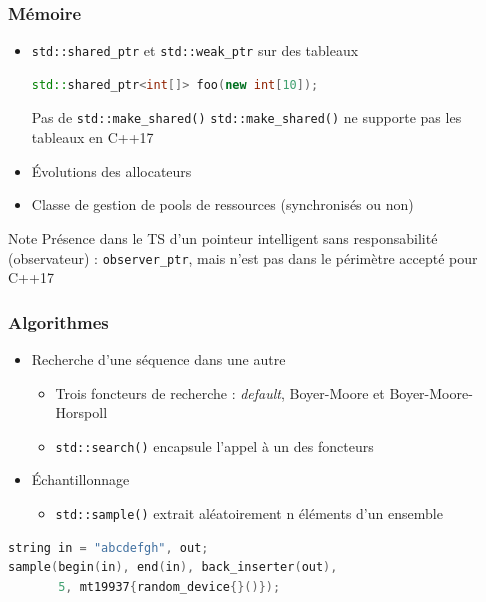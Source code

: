 \documentclass[C++.tex]{subfiles}
\begin{document}
\begin{frame}[fragile]
	\frametitle{Mémoire}
	\begin{itemize}
		\item \lstinline|std::shared_ptr| et \lstinline|std::weak_ptr| sur des tableaux

	\begin{lstlisting}[language=C++]
std::shared_ptr<int[]> foo(new int[10]);\end{lstlisting}

\begin{alertblock}{Pas de \lstinline|std::make_shared()|}
	\lstinline|std::make_shared()| ne supporte pas les tableaux en C++17
\end{alertblock}

		\item Évolutions des allocateurs


		\item Classe de gestion de pools de ressources (synchronisés ou non)
	\end{itemize}

	\begin{block}{Note}
		Présence dans le TS d'un pointeur intelligent sans responsabilité (observateur) : \lstinline|observer_ptr|, mais n'est pas dans le périmètre accepté pour C++17
	\end{block}
\end{frame}

\begin{frame}[fragile]
	\frametitle{Algorithmes}
	\begin{itemize}
		\item Recherche d'une séquence dans une autre
		\begin{itemize}
			\item Trois foncteurs de recherche : \textit{default}, Boyer-Moore et Boyer-Moore-Horspoll
			\item \lstinline|std::search()| encapsule l'appel à un des foncteurs
		\end{itemize}
		\item Échantillonnage
		\begin{itemize}
			\item \lstinline|std::sample()| extrait aléatoirement n éléments d'un ensemble
		\end{itemize}
	\end{itemize}

	\begin{lstlisting}[language=C++]
string in = "abcdefgh", out;
sample(begin(in), end(in), back_inserter(out), 
       5, mt19937{random_device{}()});\end{lstlisting}
\end{frame}
\end{document}
